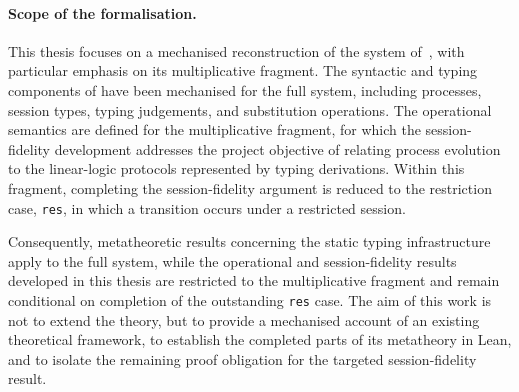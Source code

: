 \paragraph{Scope of the formalisation.} 
This thesis focuses on a mechanised reconstruction of the \pill{} system of~\citet{abs-2106-11818}, with particular emphasis on its multiplicative fragment. The syntactic and typing components of \pill{} have been mechanised for the full system, including processes, session types, typing judgements, and substitution operations. The operational semantics are defined for the multiplicative fragment, for which the session-fidelity development addresses the project objective of relating process evolution to the linear-logic protocols represented by typing derivations. Within this fragment, completing the session-fidelity argument is reduced to the restriction case, \texttt{res}, in which a transition occurs under a restricted session.

Consequently, metatheoretic results concerning the static typing infrastructure apply to the full system, while the operational and session-fidelity results developed in this thesis are restricted to the multiplicative fragment and remain conditional on completion of the outstanding \texttt{res} case. The aim of this work is not to extend the theory, but to provide a mechanised account of an existing theoretical framework, to establish the completed parts of its metatheory in Lean, and to isolate the remaining proof obligation for the targeted session-fidelity result.
